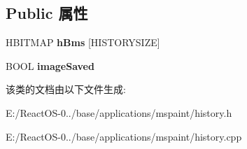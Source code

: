 \subsection*{Public 属性}
\begin{DoxyCompactItemize}
\item 
\mbox{\label{class_image_model_ac745f115ad56ffd28bc7b5cbb92ed2d7}} 
H\+B\+I\+T\+M\+AP {\bfseries h\+Bms} \mbox{[}H\+I\+S\+T\+O\+R\+Y\+S\+I\+ZE\mbox{]}
\item 
\mbox{\label{class_image_model_a7df098729ce7627e25c4cd8cb2d249cd}} 
B\+O\+OL {\bfseries image\+Saved}
\end{DoxyCompactItemize}


该类的文档由以下文件生成\+:\begin{DoxyCompactItemize}
\item 
E\+:/\+React\+O\+S-\/0../base/applications/mspaint/history.\+h\item 
E\+:/\+React\+O\+S-\/0../base/applications/mspaint/history.\+cpp\end{DoxyCompactItemize}
